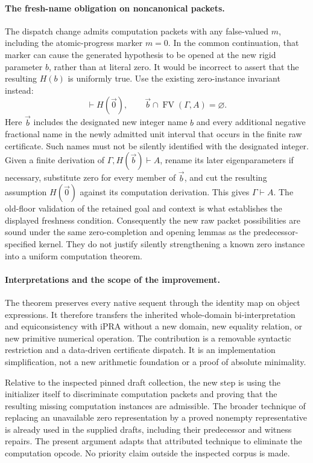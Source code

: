 \documentclass[11pt,letterpaper]{article}
\theoremstyle{definition}\newtheorem{definition}[theorem]{Definition}
\theoremstyle{remark}\newtheorem{remark}[theorem]{Remark}
\begin{document}
\paragraph{The fresh-name obligation on noncanonical packets.}
The dispatch change admits computation packets with any false-valued
$m$, including the atomic-progress marker $m=0$.  In the common
continuation, that marker can cause the generated hypothesis to be
opened at the new rigid parameter $b$, rather than at literal zero.
It would be incorrect to assert that the resulting $H(b)$ is uniformly
true.  Use the existing zero-instance invariant instead:
\[
        \vdash H(\vec0),\qquad
        \vec b\cap\operatorname{FV}(\Gamma,A)=\varnothing.
\]
Here $\vec b$ includes the designated new integer name $b$ and every
additional negative fractional name in the newly admitted unit interval
that occurs in the finite raw certificate.  Such names must not be
silently identified with the designated integer.  Given a finite
derivation of $\Gamma,H(\vec b)\vdash A$, rename its later
eigenparameters if necessary, substitute zero for every member of
$\vec b$, and cut the resulting assumption $H(\vec0)$ against its
computation derivation.  This
gives $\Gamma\vdash A$.  The old-floor validation of the retained goal
and context is what establishes the displayed freshness condition.
Consequently the new raw packet possibilities are sound under the same
zero-completion and opening lemmas as the predecessor-specified kernel.
They do not justify silently strengthening a known zero instance into
a uniform computation theorem.

\paragraph{Interpretations and the scope of the improvement.}
The theorem preserves every native sequent through the identity map on
object expressions.  It therefore transfers the inherited whole-domain
bi-interpretation and equiconsistency with iPRA without a new domain,
new equality relation, or new primitive numerical operation.  The
contribution is a removable syntactic restriction and a data-driven
certificate dispatch.  It is an implementation simplification, not a
new arithmetic foundation or a proof of absolute minimality.

Relative to the inspected pinned draft collection, the new step is
using the initializer itself to discriminate computation packets and
proving that the resulting missing computation instances are admissible.
The broader technique of replacing an unavailable zero representation
by a proved nonempty representative is already used in the supplied
drafts, including their predecessor and witness repairs.  The present
argument adapts that attributed technique to eliminate the computation
opcode.  No priority claim outside the inspected corpus is made.
\end{document}
